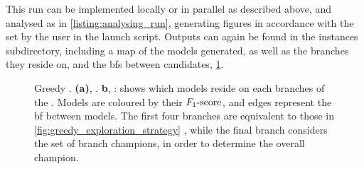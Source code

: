 This \gls{run} can be implemented locally or in parallel as described above\footnotemark,
    and analysed as in \cref{listing:analysing_run},
    generating figures in accordance with the  set by the user in the launch script. 
Outputs can again be found in the \glspl{instance} subdirectory, including a map of the models generated, 
    as well as the branches they reside on, and the \glspl{bf} between candidates, \cref{fig:example_es_greedy}. 

\begin{figure}[H]
    \begin{center}
    \qquad
    \end{center}
    \caption[Greedy ]{
        Greedy . 
        \textbf{(a)}, . 
        \textbf{b}, : shows which models reside on each branches of the . 
        Models are coloured by their $ F_{1}\text{-score} $, and edges represent the \gls{bf} between models. 
        The first four branches are equivalent to those in \cref{fig:greedy_exploration_strategy} ,
        while the final branch considers the set of branch champions, in order to determine the overall champion. 
    }
    \label{fig:example_es_greedy}
\end{figure}


